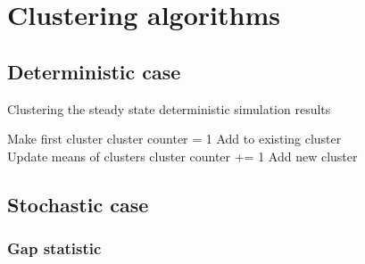 
\section{Clustering algorithms}

\subsection{Deterministic case}
\begin{algorithm}
  \caption{Clustering the steady state deterministic simulation results}
 \begin{algorithmic}[1]
    \Statex
      
      		\State Make first cluster
      		\State cluster counter = 1
      	\Else
      					\State Add to existing cluster \\
      					\State Update means of clusters
      			\EndIf
      				\State cluster counter +=  1
      				\State Add new cluster

      			\EndIf
      		\EndFor
      	\EndIf
	
      \EndFor

        
  \end{algorithmic}
\end{algorithm}

\subsection{Stochastic case}
\subsubsection{Gap statistic}

